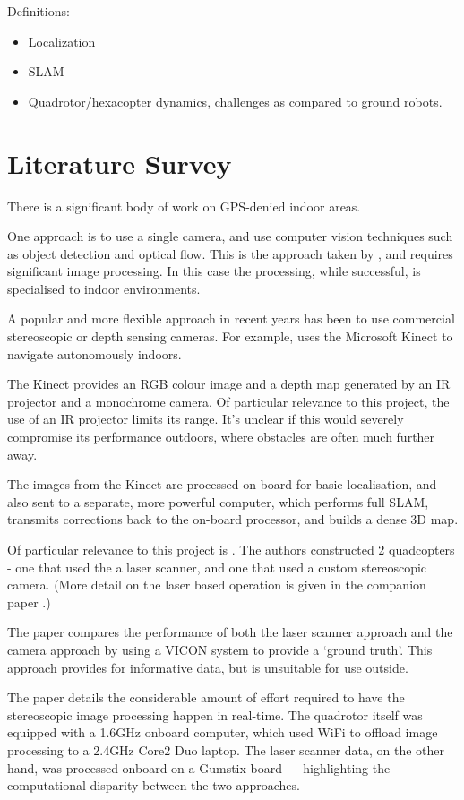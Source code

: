 \documentclass[12pt,oneside,a4paper]{book}
\begin{document}
Definitions:
\begin{itemize}
\item Localization
\item SLAM
\item Quadrotor/hexacopter dynamics, challenges as compared to ground robots.
\end{itemize}


\section{Literature Survey}
\label{sec:litsurvey}

There is a significant body of work on GPS-denied indoor areas.

One approach is to use a single camera, and use computer vision
techniques such as object detection and optical flow. This is the
approach taken by \cite{5152680}, and requires significant image
processing. In this case the processing, while successful, is
specialised to indoor environments.

A popular and more flexible approach in recent years has been to use
commercial stereoscopic or depth sensing cameras. For example,
\cite{huang2011visual} uses the Microsoft Kinect to navigate
autonomously indoors.

The Kinect provides an RGB colour image and a depth map generated by
an IR projector and a monochrome camera. Of particular relevance to
this project, the use of an IR projector limits its range. It's
unclear if this would severely compromise its performance outdoors,
where obstacles are often much further away.

The images from the Kinect are processed on board for basic
localisation, and also sent to a separate, more powerful computer,
which performs full SLAM, transmits corrections back to the on-board
processor, and builds a dense 3D map.

Of particular relevance to this project is \cite{achtelik2009stereo}. The authors
constructed 2 quadcopters - one that used the a laser scanner, and one
that used a custom stereoscopic camera. (More detail on the laser
based operation is given in the companion paper
\cite{Bachrach09autonomousflight}.) 

The paper compares the performance of both the laser scanner
approach and the camera approach by using a VICON system to provide a
`ground truth'. This approach provides for informative data, but is
unsuitable for use outside.

The paper details the considerable amount of effort required to have
the stereoscopic image processing happen in real-time. The quadrotor
itself was equipped with a 1.6GHz onboard computer, which used WiFi to
offload image processing to a 2.4GHz Core2 Duo laptop. The laser
scanner data, on the other hand, was processed onboard on a Gumstix
board --- highlighting the computational disparity between the two
approaches.
\end{document}
